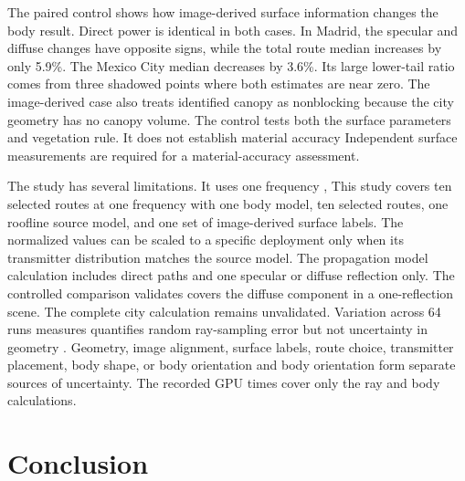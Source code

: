 \documentclass{IEEEoj}
\providecommand{\DIFadd}[1]{{\protect\color{blue} \sf #1}} %
\providecommand{\DIFdel}[1]{{\protect\color{red} \scriptsize #1}} %
\providecommand{\DIFaddbegin}{} %
\providecommand{\DIFaddend}{} %
\providecommand{\DIFdelbegin}{} %
\providecommand{\DIFdelend}{} %
\begin{document}
The paired control shows how image-derived surface information changes the body
result. Direct power is identical in both cases. In Madrid, the specular and
diffuse changes have opposite signs, while the total route median increases by
only 5.9\%. The Mexico City median decreases by 3.6\%. Its large lower-tail
ratio comes from three shadowed points where both estimates are near zero. The
image-derived case also treats identified canopy as
nonblocking because the city geometry has no canopy volume. The control tests
both the surface parameters and vegetation rule. \DIFdelbegin \DIFdel{It does not establish material
accuracy}\DIFdelend \DIFaddbegin \DIFadd{Independent surface
measurements are required for a material-accuracy assessment}\DIFaddend .

\DIFdelbegin \DIFdel{The study has several limitations. It uses one frequency , }\DIFdelend \DIFaddbegin \DIFadd{This study covers ten selected routes at one frequency with }\DIFaddend one body model, \DIFdelbegin \DIFdel{ten
selected routes, }\DIFdelend one
roofline source model, and one set of image-derived surface labels. The
normalized values can be scaled to a specific deployment \DIFdelbegin \DIFdel{only }\DIFdelend when its transmitter
distribution matches the source model. The propagation \DIFdelbegin \DIFdel{model
}\DIFdelend \DIFaddbegin \DIFadd{calculation }\DIFaddend includes
direct paths and one specular or diffuse reflection\DIFdelbegin \DIFdel{only}\DIFdelend . The controlled comparison
\DIFdelbegin \DIFdel{validates }\DIFdelend \DIFaddbegin \DIFadd{covers }\DIFaddend the diffuse component in a one-reflection scene. \DIFdelbegin \DIFdel{The complete city calculation remains unvalidated. }\DIFdelend Variation across 64
runs \DIFdelbegin \DIFdel{measures
}\DIFdelend \DIFaddbegin \DIFadd{quantifies }\DIFaddend random ray-sampling error\DIFdelbegin \DIFdel{but not uncertainty in geometry}\DIFdelend \DIFaddbegin \DIFadd{. Geometry}\DIFaddend , image alignment, surface
labels, route choice, transmitter placement, body shape, \DIFdelbegin \DIFdel{or body orientation
}\DIFdelend \DIFaddbegin \DIFadd{and body orientation
form separate sources of uncertainty}\DIFaddend . The recorded GPU times cover \DIFdelbegin \DIFdel{only }\DIFdelend \DIFaddbegin \DIFadd{the }\DIFaddend ray and
body calculations.

\section{Conclusion}\label{sec:conclusion}
\end{document}
